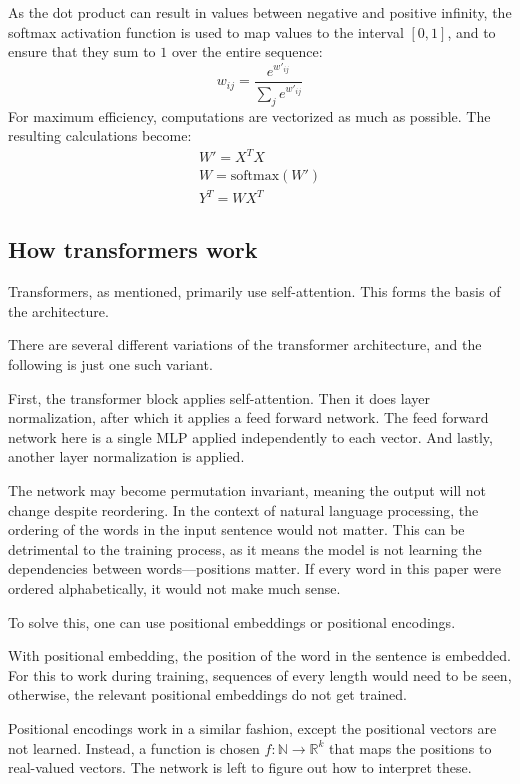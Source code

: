 As the dot product can result in values between negative and positive infinity, the softmax activation function is used to map values to the interval $[0,1]$, and to ensure that they sum to $1$ over the entire sequence:
$$
w_{ij}=\frac{e^{w'_{ij}}}{\sum_{j}e^{w'_{ij}}}
$$
For maximum efficiency, computations are vectorized as much as possible. The resulting calculations become:
\begin{gather}
W'=X^TX\\
W=\text{softmax}(W')\\
Y^T=WX^T
\end{gather}\cite{TransformersScratchPeterbloem}


\subsection{How transformers work}
Transformers, as mentioned, primarily use self-attention. This forms the basis of the architecture.

There are several different variations of the transformer architecture, and the following is just one such variant.

First, the transformer block applies self-attention. Then it does layer normalization, after which it applies a feed forward network. The feed forward network here is a single MLP applied independently to each vector. And lastly, another layer normalization is applied.

The network may become permutation invariant, meaning the output will not change despite reordering. In the context of natural language processing, the ordering of the words in the input sentence would not matter. This can be detrimental to the training process, as it means the model is not learning the dependencies between words---positions matter. If every word in this paper were ordered alphabetically, it would not make much sense.

To solve this, one can use positional embeddings or positional encodings.

With positional embedding, the position of the word in the sentence is embedded. For this to work during training, sequences of every length would need to be seen, otherwise, the relevant positional embeddings do not get trained.

Positional encodings work in a similar fashion, except the positional vectors are not learned.
Instead, a function is chosen $f:\mathbb{N}\rightarrow\mathbb{R}^k$ that maps the positions to real-valued vectors. The network is left to figure out how to interpret these.\cite{TransformersScratchPeterbloem}